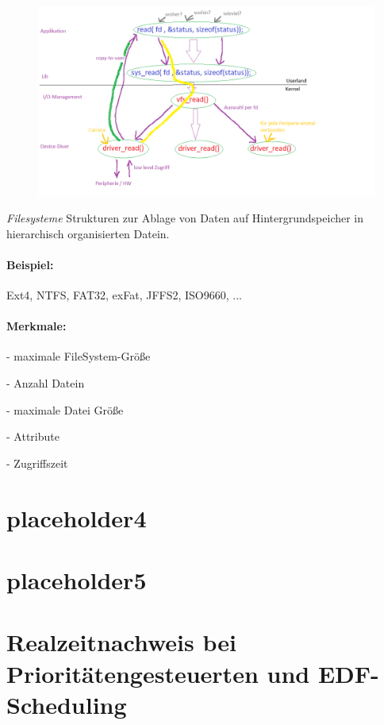 \documentclass[12pt,a4paper,oneside,ngerman]{article}
\begin{document}
\begin{figure}[ht]
	\centering
	\includegraphics[scale=0.5]{umlet/Seite_34.png}
\end{figure}

\emph{Filesysteme}
Strukturen zur Ablage von Daten auf Hintergrundspeicher in hierarchisch organisierten Datein.\\
\paragraph{Beispiel:} Ext4, NTFS, FAT32, exFat, JFFS2, ISO9660, ...\\

\paragraph{Merkmale:}
\begin{description}
	\item - maximale FileSystem-Größe
	\item - Anzahl Datein
	\item - maximale Datei Größe
	\item - Attribute
	\item - Zugriffszeit
\end{description}

\section[placeholder4]{placeholder4}
\section[placeholder5]{placeholder5}

\section[Realzeitnachweis]{Realzeitnachweis bei Prioritätengesteuerten und EDF-Scheduling}
\end{document}
